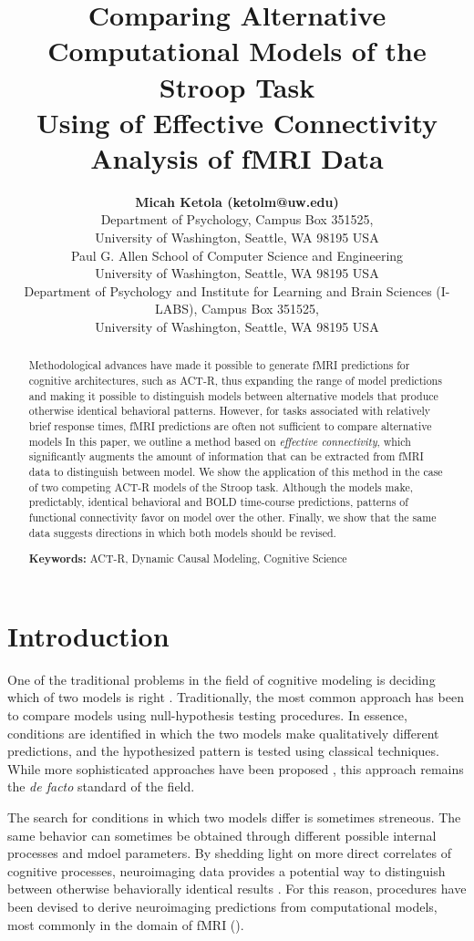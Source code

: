 \documentclass[10pt,letterpaper]{article}
\title{Comparing Alternative Computational Models of the Stroop Task \\Using of Effective Connectivity Analysis of fMRI Data}
\author{{\large \bf Micah Ketola (ketolm@uw.edu)} \\
  Department of Psychology, Campus Box 351525, \\
  University of Washington, Seattle, WA 98195 USA
  \AND {\large \bf Linxing Preston Jiang (prestonj@cs.washington.edu)} \\
  Paul G. Allen School of Computer Science and Engineering\\
  University of Washington, Seattle, WA 98195 USA 
  \AND {\large \bf Andrea Stocco (stocco@uw.edu)} \\
  Department of Psychology and Institute for Learning and Brain Sciences (I-LABS), Campus Box 351525, \\
  University of Washington, Seattle, WA 98195 USA}
\begin{document}
\maketitle


\begin{abstract}
Methodological advances have made it possible to generate fMRI predictions for cognitive architectures, such as ACT-R, thus expanding the range of model predictions and making it possible to distinguish models between alternative models that produce otherwise identical behavioral patterns. However, for tasks associated with relatively brief response times, fMRI predictions are often not sufficient to compare alternative models In this paper, we outline a method based on {\it effective connectivity}, which significantly augments the amount of information that can be extracted from fMRI data to distinguish between model. We show the application of this method in the case of two competing ACT-R models of the Stroop task. Although the models make, predictably, identical behavioral and BOLD time-course predictions, patterns of functional connectivity favor on model over the other. Finally, we show that the same data suggests directions in which both models should be revised.

\textbf{Keywords:} 
ACT-R, Dynamic Causal Modeling, Cognitive Science
\end{abstract}

\section{Introduction}

One of the traditional problems in the field of cognitive modeling is deciding which of two models is right \cite{Pitt2006}. Traditionally, the most common approach has been to compare models using null-hypothesis testing procedures. In essence, conditions are identified in which the two models make qualitatively different predictions, and the hypothesized pattern is tested using classical techniques. While more sophisticated approaches have been proposed \cite{Pitt2006, Veksler2015}, this approach remains the {\it de facto} standard of the field.

The search for conditions in which two models differ is sometimes streneous. The same behavior can sometimes be obtained through different possible internal processes and mdoel parameters. By shedding light on more direct correlates of cognitive processes, neuroimaging data provides a potential way to distinguish between otherwise behaviorally identical results \cite{Sohn2004}. For this reason, procedures have been devised to derive neuroimaging predictions from computational models, most commonly in the domain of fMRI (\cite{Anderson2008}).
\end{document}
